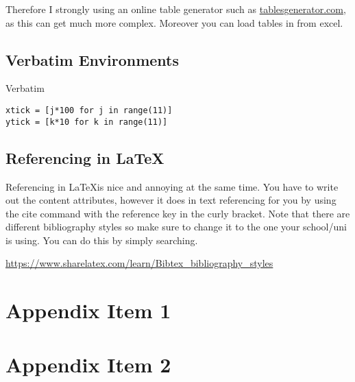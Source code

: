 \documentclass[11pt,a4paper,titlepage]{article}
\begin{document}
Therefore I strongly using an online table generator such as \href{https://www.tablesgenerator.com/latex_tables}{tablesgenerator.com}, as this can get much more complex. Moreover you can load tables in from excel.

\medskip

\subsection{Verbatim Environments}

Verbatim

\begin{verbatim}
xtick = [j*100 for j in range(11)]
ytick = [k*10 for k in range(11)]
\end{verbatim}

\subsection{Referencing in \LaTeX}

Referencing in \LaTeX is nice and annoying at the same time. You have to write out the content attributes, however it does in text referencing for you by using  the cite command with the reference key in the curly bracket. Note that there are different bibliography styles so make sure to change it to the one your school/uni is using. You can do this by simply searching.

\url{https://www.sharelatex.com/learn/Bibtex_bibliography_styles}






\clearpage
\appendix


\section{Appendix Item 1}
\label{appendix:Appendix1}

\section{Appendix Item 2}
\label{appendix:Appendix2}
\end{document}
